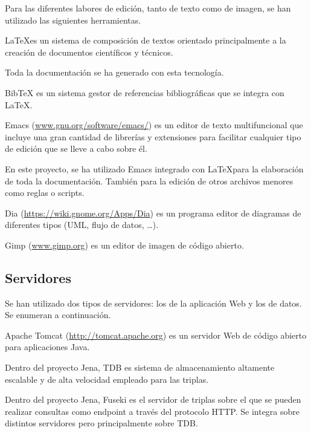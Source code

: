 Para las diferentes labores de edición, tanto de texto como de imagen, se han
utilizado las siguientes herramientas. 

\begin{definitionlist} 
\item[\LaTeX]

  \LaTeX es un sistema de composición de textos orientado principalmente a la
  creación de documentos científicos y técnicos. 

  Toda la documentación se ha generado con esta tecnología. 

\item[BibTeX]
  BibTeX es un sistema gestor de referencias bibliográficas que se integra con
\LaTeX.

\item[Emacs]

  Emacs (\url{www.gnu.org/software/emacs/}) es un editor de texto multifuncional
  que incluye una gran cantidad de librerías y extensiones para facilitar
  cualquier tipo de edición que se lleve a cabo sobre él. 

  En este proyecto, se ha utilizado Emacs integrado con \LaTeX para la
  elaboración de toda la documentación. También para la edición de otros archivos
  menores como reglas o scripts. 

\item[Dia]

  Dia (\url{https://wiki.gnome.org/Apps/Dia}) es un programa editor de diagramas
  de diferentes tipos (\acs{UML}, flujo de datos, \ldots). 

\item[Gimp]

  
  Gimp (\url{www.gimp.org}) es un editor de imagen de código abierto. 

\end{definitionlist}

\subsection{Servidores}

Se han utilizado dos tipos de servidores: los de la aplicación Web y los de
datos. Se enumeran a continuación. 

\begin{definitionlist} 
\item[Apache Tomcat]

Apache Tomcat (\url{http://tomcat.apache.org}) es un servidor Web de código
abierto para aplicaciones Java. 

\item[Jena TDB]

Dentro del proyecto Jena, TDB es sistema de almacenamiento altamente escalable y
de alta velocidad empleado para las triplas. 


\item[Jena Fuseki]

Dentro del proyecto Jena, Fuseki es el servidor de triplas sobre el que se
pueden realizar consultas como endpoint a través del protocolo \acs{HTTP}. Se
integra sobre distintos servidores pero principalmente sobre TDB. 

\end{definitionlist}

